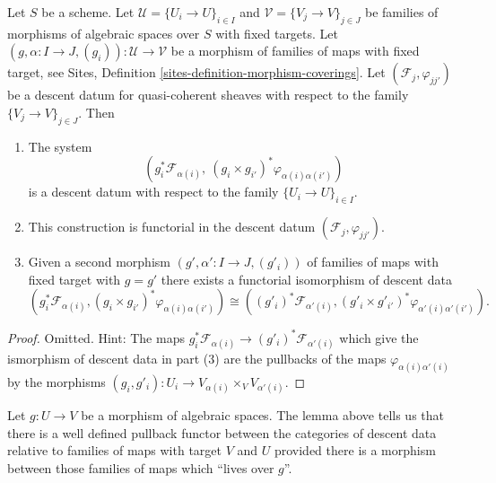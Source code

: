 \begin{lemma}
\label{lemma-map-families}
Let $S$ be a scheme.
Let $\mathcal{U} = \{U_i \to U\}_{i \in I}$ and
$\mathcal{V} = \{V_j \to V\}_{j \in J}$
be families of morphisms of algebraic spaces over $S$ with fixed targets.
Let $(g, \alpha : I \to J, (g_i)) : \mathcal{U} \to \mathcal{V}$
be a morphism of families of maps with fixed target, see
Sites, Definition \ref{sites-definition-morphism-coverings}.
Let $(\mathcal{F}_j, \varphi_{jj'})$ be a descent
datum for quasi-coherent sheaves with respect to the
family $\{V_j \to V\}_{j \in J}$. Then
\begin{enumerate}
\item The system
$$
\left(g_i^*\mathcal{F}_{\alpha(i)}, \ 
(g_i \times g_{i'})^*\varphi_{\alpha(i)\alpha(i')}\right)
$$
is a descent datum with respect to the family $\{U_i \to U\}_{i \in I}$.
\item This construction is functorial in the descent datum
$(\mathcal{F}_j, \varphi_{jj'})$.
\item Given a second morphism
$(g', \alpha' : I \to J, (g'_i))$
of families of maps with fixed target
with $g = g'$ there exists a functorial isomorphism of descent data
$$
(g_i^*\mathcal{F}_{\alpha(i)},
(g_i \times g_{i'})^*\varphi_{\alpha(i)\alpha(i')})
\cong
((g'_i)^*\mathcal{F}_{\alpha'(i)},
(g'_i \times g'_{i'})^*\varphi_{\alpha'(i)\alpha'(i')}).
$$
\end{enumerate}
\end{lemma}

\begin{proof}
Omitted. Hint: The maps
$g_i^*\mathcal{F}_{\alpha(i)} \to (g'_i)^*\mathcal{F}_{\alpha'(i)}$
which give the ismorphism of descent data in part (3)
are the pullbacks of the maps $\varphi_{\alpha(i)\alpha'(i)}$ by the
morphisms $(g_i, g'_i) : U_i \to V_{\alpha(i)} \times_V V_{\alpha'(i)}$.
\end{proof}

\noindent
Let $g : U \to V$ be a morphism of algebraic spaces.
The lemma above tells us that there is a well defined pullback functor
between the categories of descent data relative to families of
maps with target $V$ and $U$ provided there is a morphism between those
families of maps which ``lives over $g$''.

